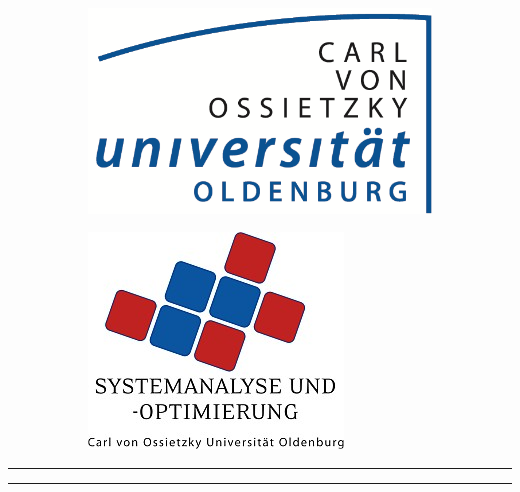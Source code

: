 \documentclass[
	12pt, %
	a4paper, %
	oneside, %
	chapterprefix, %
	listof=totoc, %
]{scrbook}
\newcommand*{\universitaet}[1]{\def\universitaet{#1}}
\newcommand*{\fach}[1]{\def\fach{#1}}
\newcommand*{\arbeitsart}[1]{\def\arbeitsart{#1}}
\newcommand*{\titel}[1]{\def\titel{#1}}
\begin{document}
\frontmatter %



\makeatletter
\begin{titlepage}
\centering
\begin{figure}[htb]
  \centering
  \begin{subfigure}{0.5\textwidth}
    \centering
    \includegraphics[scale=1.8]{Abbildungen/uni_ol_logo.png}
    \end{subfigure}%
    \begin{subfigure}{0.5\textwidth}
      \centering
      \includegraphics[scale=0.35]{Abbildungen/abteilungslogo.jpg}
    \end{subfigure}
\end{figure}

{\scshape\Large\universitaet\par}
\vspace{1cm}
{\scshape\normalsize\fach\par}
{\scshape\normalsize\arbeitsart\par}

\vfill

\hrule
\vspace{1cm}
{\LARGE\bfseries\titel\par}
\vspace{1cm}
\hrule


\end{titlepage}
\end{document}
